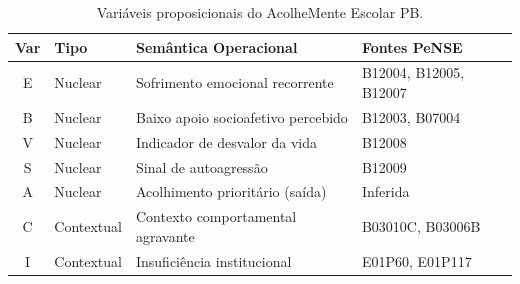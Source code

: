 
\begin{table}[H]
\centering
\caption{Variáveis proposicionais do AcolheMente Escolar PB.}
\label{tab:variaveis}
\begin{tabular}{clll}
\toprule
\textbf{Var} & \textbf{Tipo} & \textbf{Semântica Operacional} & \textbf{Fontes PeNSE} \\
\midrule
E & Nuclear    & Sofrimento emocional recorrente       & B12004, B12005, B12007 \\
B & Nuclear    & Baixo apoio socioafetivo percebido     & B12003, B07004 \\
V & Nuclear    & Indicador de desvalor da vida          & B12008 \\
S & Nuclear    & Sinal de autoagressão                  & B12009 \\
A & Nuclear    & Acolhimento prioritário (saída)        & Inferida \\
C & Contextual & Contexto comportamental agravante      & B03010C, B03006B \\
I & Contextual & Insuficiência institucional             & E01P60, E01P117 \\
\bottomrule
\end{tabular}
\end{table}
